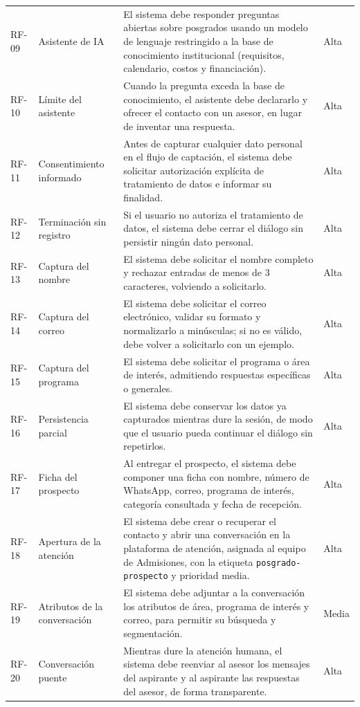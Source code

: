 \documentclass[12pt,a4paper]{report}
\begin{document}
{\begin{longtable}{p{1.4cm}p{3.3cm}p{7.4cm}p{1.4cm}}
RF-09 & Asistente de IA & El sistema debe responder preguntas abiertas sobre posgrados usando un modelo de lenguaje restringido a la base de conocimiento institucional (requisitos, calendario, costos y financiación). & Alta \\
RF-10 & Límite del asistente & Cuando la pregunta exceda la base de conocimiento, el asistente debe declararlo y ofrecer el contacto con un asesor, en lugar de inventar una respuesta. & Alta \\
RF-11 & Consentimiento informado & Antes de capturar cualquier dato personal en el flujo de captación, el sistema debe solicitar autorización explícita de tratamiento de datos e informar su finalidad. & Alta \\
RF-12 & Terminación sin registro & Si el usuario no autoriza el tratamiento de datos, el sistema debe cerrar el diálogo sin persistir ningún dato personal. & Alta \\
RF-13 & Captura del nombre & El sistema debe solicitar el nombre completo y rechazar entradas de menos de 3 caracteres, volviendo a solicitarlo. & Alta \\
RF-14 & Captura del correo & El sistema debe solicitar el correo electrónico, validar su formato y normalizarlo a minúsculas; si no es válido, debe volver a solicitarlo con un ejemplo. & Alta \\
RF-15 & Captura del programa & El sistema debe solicitar el programa o área de interés, admitiendo respuestas específicas o generales. & Alta \\
RF-16 & Persistencia parcial & El sistema debe conservar los datos ya capturados mientras dure la sesión, de modo que el usuario pueda continuar el diálogo sin repetirlos. & Alta \\
RF-17 & Ficha del prospecto & Al entregar el prospecto, el sistema debe componer una ficha con nombre, número de WhatsApp, correo, programa de interés, categoría consultada y fecha de recepción. & Alta \\
RF-18 & Apertura de la atención & El sistema debe crear o recuperar el contacto y abrir una conversación en la plataforma de atención, asignada al equipo de Admisiones, con la etiqueta \texttt{posgrado-prospecto} y prioridad media. & Alta \\
RF-19 & Atributos de la conversación & El sistema debe adjuntar a la conversación los atributos de área, programa de interés y correo, para permitir su búsqueda y segmentación. & Media \\
RF-20 & Conversación puente & Mientras dure la atención humana, el sistema debe reenviar al asesor los mensajes del aspirante y al aspirante las respuestas del asesor, de forma transparente. & Alta \\

\end{longtable}}
\end{document}
